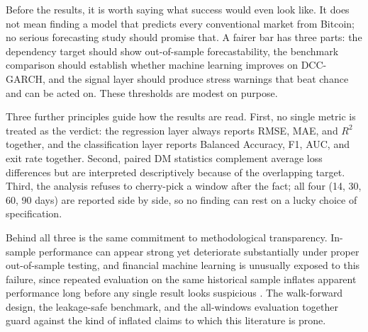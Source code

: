 Before the results, it is worth saying what success would even look like. It does not mean finding a model that predicts every conventional market from Bitcoin; no serious forecasting study should promise that. A fairer bar has three parts: the dependency target should show out-of-sample forecastability, the benchmark comparison should establish whether machine learning improves on DCC-GARCH, and the signal layer should produce stress warnings that beat chance and can be acted on. These thresholds are modest on purpose.

Three further principles guide how the results are read. First, no single metric is treated as the verdict: the regression layer always reports RMSE, MAE, and $R^2$ together, and the classification layer reports Balanced Accuracy, F1, AUC, and exit rate together. Second, paired DM statistics complement average loss differences but are interpreted descriptively because of the overlapping target. Third, the analysis refuses to cherry-pick a window after the fact; all four (14, 30, 60, 90 days) are reported side by side, so no finding can rest on a lucky choice of specification.

Behind all three is the same commitment to methodological transparency. In-sample performance can appear strong yet deteriorate substantially under proper out-of-sample testing, and financial machine learning is unusually exposed to this failure, since repeated evaluation on the same historical sample inflates apparent performance long before any single result looks suspicious \cite{lopezdeprado2018advances}. The walk-forward design, the leakage-safe benchmark, and the all-windows evaluation together guard against the kind of inflated claims to which this literature is prone.
